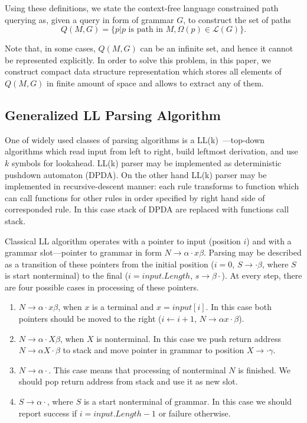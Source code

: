 Using these definitions, we state the context-free language constrained path querying as, given a query in form of grammar $G$, to construct the set of paths $$Q(M,G)=\{p|p \text{ is path in } M, \Omega(p) \in \mathcal{L}(G)\}.$$

Note that, in some cases, $Q(M,G)$ can be an infinite set, and hence it cannot be represented explicitly. 
In order to solve this problem, in this paper, we construct compact data structure representation which stores all elements of $Q(M,G)$ in finite amount of space and allows to extract any of them.

\subsection{Generalized LL Parsing Algorithm}\label{BasicGLL}

One of widely used classes of parsing algorithms is a LL(k)~\cite{Grune}---top-down algorithms which read input from left to right, build leftmost derivation, and use $k$ symbols for lookahead.
LL(k) parser may be implemented as deterministic pushdown automaton (DPDA).
On the other hand LL(k) parser may be implemented in recursive-descent manner: each rule transforms to function which can call functions for other rules in order specified by right hand side of corresponded rule.
In this case stack of DPDA are replaced with functions call stack.

Classical LL algorithm operates with a pointer to input (position $i$) and with a grammar slot---pointer to grammar in form $N \rightarrow \alpha \cdot x \beta $.
Parsing may be described as a transition of these pointers from the initial position ($i = 0$, $S \rightarrow \cdot \beta $, where $S$ is start nonterminal) to the final ($i = input.Length$, $s \rightarrow \beta \cdot$).
At every step, there are four possible cases in processing of these pointers. 

\begin{enumerate}
\item $N \rightarrow \alpha \cdot x \beta $, when $x$ is a terminal and $x = input[i]$. In this case both pointers should be moved to the right ($i \leftarrow i + 1$, $N \rightarrow \alpha  x \cdot \beta $).
\item $N \rightarrow \alpha \cdot X \beta $, when $X$ is nonterminal. In this case we push return address $N \rightarrow \alpha X \cdot \beta $ to stack and move pointer in grammar to position $X \rightarrow \cdot \gamma$.\label{itm:2}
\item $N \rightarrow \alpha \cdot $. This case means that processing of nonterminal $N$ is finished. We should pop return address from stack and use it as new slot.\label{itm:3}
\item $S \rightarrow \alpha \cdot $, where $S$ is a start nonterminal of grammar. In this case we should report success if $i = input.Length - 1$ or failure otherwise. 
\end{enumerate}

